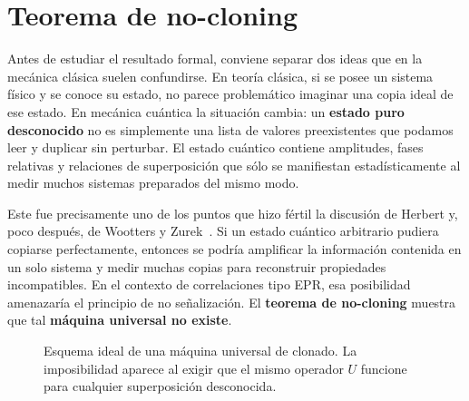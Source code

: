 \documentclass[../main.tex]{subfiles}
\begin{document}
\chapter{Teorema de no-cloning}

Antes de estudiar el resultado formal, conviene separar dos ideas que en la mecánica clásica suelen confundirse. En teoría clásica, si se posee un sistema físico y se conoce su estado, no parece problemático imaginar una copia ideal de ese estado. En mecánica cuántica la situación cambia: un \textbf{estado puro desconocido} no es simplemente una lista de valores preexistentes que podamos leer y duplicar sin perturbar. El estado cuántico contiene amplitudes, fases relativas y relaciones de superposición que sólo se manifiestan estadísticamente al medir muchos sistemas preparados del mismo modo.

Este fue precisamente uno de los puntos que hizo fértil la discusión de Herbert y, poco después, de Wootters y Zurek~\cite{HerbertFLASH,WoottersZurek1982}. Si un estado cuántico arbitrario pudiera copiarse perfectamente, entonces se podría amplificar la información contenida en un solo sistema y medir muchas copias para reconstruir propiedades incompatibles. En el contexto de correlaciones tipo EPR, esa posibilidad amenazaría el principio de no señalización. El \textbf{teorema de no-cloning} muestra que tal \textbf{máquina universal no existe}.

\begin{figure}[htbp]
    \centering
    \caption{Esquema ideal de una máquina universal de clonado. La imposibilidad aparece al exigir que el mismo operador $U$ funcione para cualquier superposición desconocida.}
    \label{fig:maquina-no-cloning}
\end{figure}
\end{document}
